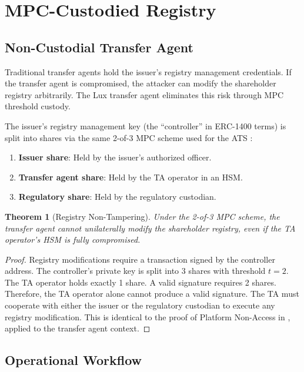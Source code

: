 \documentclass[11pt,a4paper]{article}
\newtheorem{theorem}{Theorem}
\begin{document}
\section{MPC-Custodied Registry}\label{sec:mpc}

\subsection{Non-Custodial Transfer Agent}

Traditional transfer agents hold the issuer's registry management credentials. If the transfer agent is compromised, the attacker can modify the shareholder registry arbitrarily. The Lux transfer agent eliminates this risk through MPC threshold custody.

The issuer's registry management key (the ``controller'' in ERC-1400 terms) is split into shares via the same 2-of-3 MPC scheme used for the ATS \cite{lux-ats-architecture}:

\begin{enumerate}[nosep]
  \item \textbf{Issuer share}: Held by the issuer's authorized officer.
  \item \textbf{Transfer agent share}: Held by the TA operator in an HSM.
  \item \textbf{Regulatory share}: Held by the regulatory custodian.
\end{enumerate}

\begin{theorem}[Registry Non-Tampering]
Under the 2-of-3 MPC scheme, the transfer agent cannot unilaterally modify the shareholder registry, even if the TA operator's HSM is fully compromised.
\end{theorem}

\begin{proof}
Registry modifications require a transaction signed by the controller address. The controller's private key is split into 3 shares with threshold $t = 2$. The TA operator holds exactly 1 share. A valid signature requires 2 shares. Therefore, the TA operator alone cannot produce a valid signature. The TA must cooperate with either the issuer or the regulatory custodian to execute any registry modification. This is identical to the proof of Platform Non-Access in \cite{lux-ats-architecture}, applied to the transfer agent context.
\end{proof}

\subsection{Operational Workflow}
\end{document}
